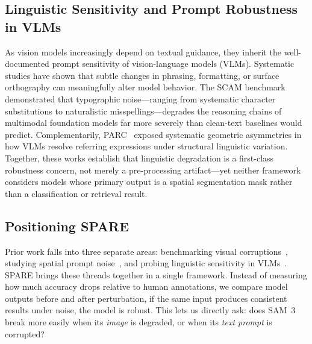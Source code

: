 \documentclass[10pt,twocolumn,letterpaper]{article}
\begin{document}
\subsection{Linguistic Sensitivity and Prompt Robustness in VLMs}

As vision models increasingly depend on textual guidance, they inherit the well-documented prompt sensitivity of vision-language models (VLMs). Systematic studies have shown that subtle changes in phrasing, formatting, or surface orthography can meaningfully alter model behavior. The SCAM benchmark~\cite{materzynska2025scam} demonstrated that typographic noise—ranging from systematic character substitutions to naturalistic misspellings—degrades the reasoning chains of multimodal foundation models far more severely than clean-text baselines would predict. Complementarily, PARC~\cite{schmalfuss2025parc} exposed systematic geometric asymmetries in how VLMs resolve referring expressions under structural linguistic variation. Together, these works establish that linguistic degradation is a first-class robustness concern, not merely a pre-processing artifact—yet neither framework considers models whose primary output is a spatial segmentation mask rather than a classification or retrieval result.

\subsection{Positioning SPARE}
Prior work falls into three separate areas: benchmarking visual corruptions~\cite{chen2024robustsam,li2025laionc}, 
studying spatial prompt noise~\cite{moskalenko2026breps}, and probing linguistic sensitivity in 
VLMs~\cite{materzynska2025scam,schmalfuss2025parc}. SPARE brings these threads together in a single framework. Instead of measuring how much accuracy drops relative to human annotations, we compare model outputs before and after perturbation, if the same input produces consistent results under noise, the model is robust. This lets us directly ask: does SAM~3 break more easily when its 
\emph{image} is degraded, or when its \emph{text prompt} is corrupted?


\end{document}
